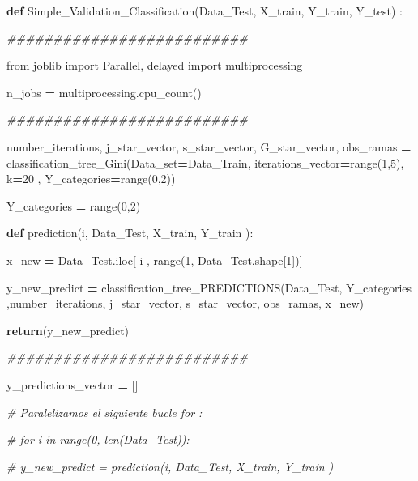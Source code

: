 \documentclass[
  11pt,
  a4paper,
]{article}
\newenvironment{Shaded}{\begin{snugshade}}{\end{snugshade}}
\newcommand{\BuiltInTok}[1]{#1}
\newcommand{\CommentTok}[1]{\textcolor[rgb]{0.56,0.35,0.01}{\textit{#1}}}
\newcommand{\ControlFlowTok}[1]{\textcolor[rgb]{0.13,0.29,0.53}{\textbf{#1}}}
\newcommand{\DecValTok}[1]{\textcolor[rgb]{0.00,0.00,0.81}{#1}}
\newcommand{\ImportTok}[1]{#1}
\newcommand{\KeywordTok}[1]{\textcolor[rgb]{0.13,0.29,0.53}{\textbf{#1}}}
\newcommand{\NormalTok}[1]{#1}
\newcommand{\OperatorTok}[1]{\textcolor[rgb]{0.81,0.36,0.00}{\textbf{#1}}}
\begin{document}
\begin{Shaded}
\begin{Highlighting}[]
\KeywordTok{def}\NormalTok{ Simple\_Validation\_Classification(Data\_Test, X\_train, Y\_train, Y\_test) :}

    \CommentTok{\#\#\#\#\#\#\#\#\#\#\#\#\#\#\#\#\#\#\#\#\#\#\#\#\#\#}

    \ImportTok{from}\NormalTok{ joblib }\ImportTok{import}\NormalTok{ Parallel, delayed}
    \ImportTok{import}\NormalTok{ multiprocessing}

\NormalTok{    n\_jobs  }\OperatorTok{=}\NormalTok{ multiprocessing.cpu\_count()}

    \CommentTok{\#\#\#\#\#\#\#\#\#\#\#\#\#\#\#\#\#\#\#\#\#\#\#\#\#\#}

\NormalTok{    number\_iterations, j\_star\_vector, s\_star\_vector, G\_star\_vector, obs\_ramas }\OperatorTok{=}\NormalTok{ classification\_tree\_Gini(Data\_set}\OperatorTok{=}\NormalTok{Data\_Train, iterations\_vector}\OperatorTok{=}\BuiltInTok{range}\NormalTok{(}\DecValTok{1}\NormalTok{,}\DecValTok{5}\NormalTok{), k}\OperatorTok{=}\DecValTok{20}\NormalTok{ , Y\_categories}\OperatorTok{=}\BuiltInTok{range}\NormalTok{(}\DecValTok{0}\NormalTok{,}\DecValTok{2}\NormalTok{))}
    
\NormalTok{    Y\_categories }\OperatorTok{=} \BuiltInTok{range}\NormalTok{(}\DecValTok{0}\NormalTok{,}\DecValTok{2}\NormalTok{)}

    \KeywordTok{def}\NormalTok{ prediction(i, Data\_Test, X\_train, Y\_train ):}

\NormalTok{     x\_new }\OperatorTok{=}\NormalTok{ Data\_Test.iloc[ i , }\BuiltInTok{range}\NormalTok{(}\DecValTok{1}\NormalTok{, Data\_Test.shape[}\DecValTok{1}\NormalTok{])]}

\NormalTok{     y\_new\_predict }\OperatorTok{=}\NormalTok{ classification\_tree\_PREDICTIONS(Data\_Test, Y\_categories ,number\_iterations, j\_star\_vector, s\_star\_vector, obs\_ramas, x\_new)}
  
     \ControlFlowTok{return}\NormalTok{(y\_new\_predict)}

    \CommentTok{\#\#\#\#\#\#\#\#\#\#\#\#\#\#\#\#\#\#\#\#\#\#\#\#\#\#}

\NormalTok{    y\_predictions\_vector }\OperatorTok{=}\NormalTok{ []}

    \CommentTok{\# Paralelizamos el siguiente bucle for :}

    \CommentTok{\# for i in  range(0, len(Data\_Test)):}

        \CommentTok{\# y\_new\_predict = prediction(i, Data\_Test, X\_train, Y\_train )}


\end{Highlighting}
\end{Shaded}
\end{document}
